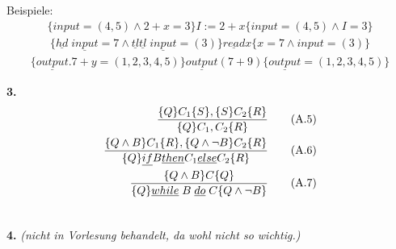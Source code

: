 \begin{compactitem}
		Beispiele:
		\begin{align*}
		\{input=(4,5)\land2+x=3\} I:=2+x \{input=(4,5)\land I=3\}
		\end{align*}
		\begin{align*}
		\{\underline{hd}\;\underline{input}=7 \land \underline{tl} \underline{tl}\;\underline{input}=(3) \} \underline{read} x \{x=7 \land input=(3)\}
		\end{align*}
		\begin{align*}
		\{\underline{output}.7+y=(1,2,3,4,5)\} \underline{output} (7+9) \{\underline{output} = (1,2,3,4,5)\}
		\end{align*}
	\item[\textbf{3.}]
	\begin{align}
	\frac{\{Q\}C_1\{S\},\{S\}C_2\{R\}}{\{Q\}C_1,C_2\{R\}}\tag{A.5}\\
	\frac{\{Q\land B\}C_1\{R\},\{Q\land \lnot B\}C_2\{R\}}{\{Q\}\underline{if}B\underline{then}C_1\underline{else}C_2\{R\}}\tag{A.6}\\
	\frac{\{Q\land B\}C\{Q\}}{\{Q\}\underline{while}\;B\;\underline{do}\;C\{Q\land \lnot B\}}\tag{A.7}\\
	\notag
	\end{align}
	\item[\textbf{4.}] \emph{(nicht in Vorlesung behandelt, da wohl nicht so wichtig.)}
\end{compactitem}
